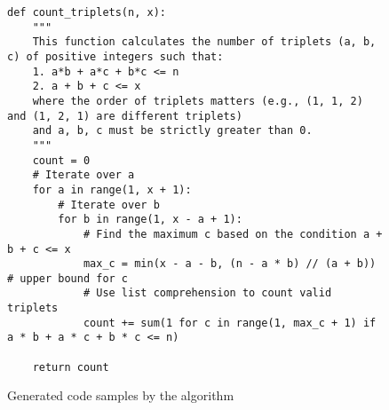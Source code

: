 \begin{figure}[H]
\centering
    \begin{lstlisting}
def count_triplets(n, x):
    """
    This function calculates the number of triplets (a, b, c) of positive integers such that:
    1. a*b + a*c + b*c <= n
    2. a + b + c <= x
    where the order of triplets matters (e.g., (1, 1, 2) and (1, 2, 1) are different triplets) 
    and a, b, c must be strictly greater than 0.
    """
    count = 0
    # Iterate over a
    for a in range(1, x + 1):
        # Iterate over b
        for b in range(1, x - a + 1):
            # Find the maximum c based on the condition a + b + c <= x
            max_c = min(x - a - b, (n - a * b) // (a + b))  # upper bound for c
            # Use list comprehension to count valid triplets
            count += sum(1 for c in range(1, max_c + 1) if a * b + a * c + b * c <= n)
    
    return count
    \end{lstlisting}

\caption{Generated code samples by the algorithm}
\end{figure}


